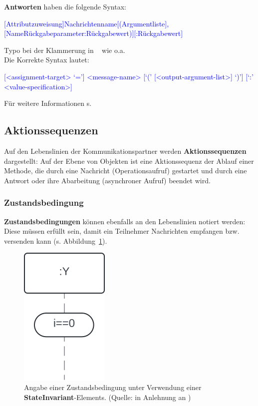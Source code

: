 \noindent
\textbf{Antworten} haben die folgende Syntax:

\medskip
\noindent
\begin{small}
    \textcolor{blue}{[Attributzuweisung]Nachrichtenname[(Argumentliste], [NameRückgabeparameter:Rückgabewert)][:Rückgabewert]}
\end{small}
\noindent

\begin{tcolorbox}[title=Syntax Antworten,colback=red!20]
    Typo bei der Klammerung in ~\cite[32]{Buh09} wie o.a.\\
    Die Korrekte Syntax lautet:

    \begin{small}
        \textcolor{blue}{
            [<assignment-target> ‘=’] <message-name>
            [‘(’ [<output-argument-list>] ‘)’] [‘:’ <value-specification>]
        }
    \end{small}
    Für weitere Informationen s. \cite[577 f.]{OMG17}

\end{tcolorbox}


\subsection*{Aktionssequenzen}
Auf den Lebenslinien der Kommunikationspartner werden \textbf{Aktionssequenzen} dargestellt: Auf der Ebene von Objekten ist eine Aktionssequenz der Ablauf einer Methode, die durch eine Nachricht (Operationsaufruf) gestartet und durch eine Antwort oder ihre Abarbeitung (asynchroner Aufruf) beendet wird.

\subsubsection*{Zustandsbedingung}
\textbf{Zustandsbedingungen} können ebenfalls an den Lebenslinien notiert werden: Diese müssen erfüllt sein, damit ein Teilnehmer Nachrichten empfangen bzw. versenden kann (s. Abbildung~\ref{fig:stateinvariant}).

\begin{figure}
    \centering
    \includegraphics[scale=0.5]{part three/Sequenzdiagramme/img/stateinvariant}
    \caption{Angabe einer Zustandsbedingung unter Verwendung einer \textbf{StateInvariant}-Elements. (Quelle: in Anlehnung an \cite[597]{OMG17})}
    \label{fig:stateinvariant}
\end{figure}

